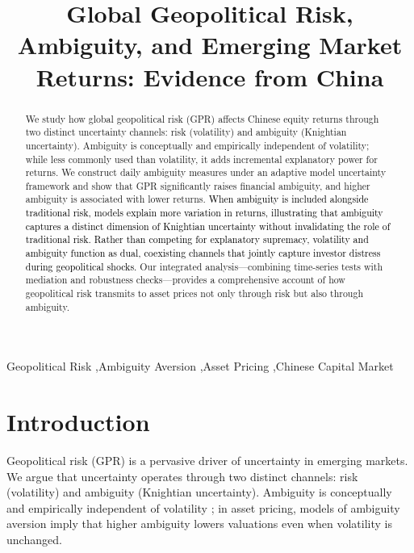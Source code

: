 \documentclass[preprint,12pt,authoryear]{elsarticle}
\begin{document}
\begin{frontmatter}

\title{Global Geopolitical Risk, Ambiguity, and Emerging Market Returns: Evidence from China}

\begin{abstract}
We study how global geopolitical risk (GPR) affects Chinese equity returns through two distinct uncertainty channels: risk (volatility) and ambiguity (Knightian uncertainty). Ambiguity is conceptually and empirically independent of volatility; while less commonly used than volatility, it adds incremental explanatory power for returns. We construct daily ambiguity measures under an adaptive model uncertainty framework and show that GPR significantly raises financial ambiguity, and higher ambiguity is associated with lower returns. \textcolor{black}{When ambiguity is included alongside traditional risk, models explain more variation in returns, illustrating that ambiguity captures a distinct dimension of Knightian uncertainty without invalidating the role of traditional risk. Rather than competing for explanatory supremacy, volatility and ambiguity function as dual, coexisting channels that jointly capture investor distress during geopolitical shocks.} Our integrated analysis—combining time-series tests with mediation and robustness checks—provides a comprehensive account of how geopolitical risk transmits to asset prices not only through risk but also through ambiguity.
\end{abstract}

\begin{keyword}
Geopolitical Risk \sep Ambiguity Aversion \sep Asset Pricing \sep Chinese Capital Market
\end{keyword}

\end{frontmatter}

\section{Introduction}

Geopolitical risk (GPR) is a pervasive driver of uncertainty in emerging markets. We argue that uncertainty operates through two distinct channels: risk (volatility) and ambiguity (Knightian uncertainty). Ambiguity is conceptually and empirically independent of volatility \citep{Knight1921, Ellsberg1961}; in asset pricing, models of ambiguity aversion \citep{Gilboa1989, Klibanoff2005} imply that higher ambiguity lowers valuations even when volatility is unchanged.
\end{document}
